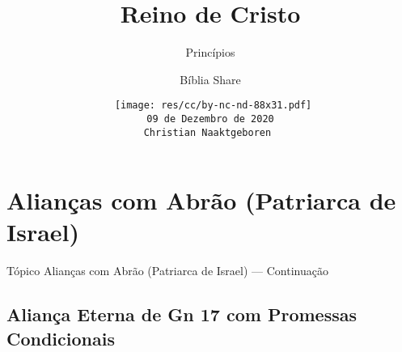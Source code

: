 \documentclass[12pt,aspectratio=169]{beamer}
\title[Reino de Cristo -- Princípios]{Reino de Cristo}
\subtitle{Princípios}
\author{Bíblia Share}
\date[{\tiny\tt 09 de Dezembro de 2020}]{{\scriptsize\tt%
    \texttt{[image: res/cc/by-nc-nd-88x31.pdf]}\\[\smallskipamount]
    09 de Dezembro de 2020\\
    Christian Naaktgeboren
}}
\newcommand{\BRI}[1]{{\textcolor{BSpbg}{#1}}}   %
\begin{document}
\begin{frame}
    \titlepage
\end{frame}
\section{Alianças com Abrão (Patriarca de Israel)}

    \begin{frame}
        \par\noindent\hspace*{0.05\linewidth}%
        \begin{minipage}{0.9\linewidth}%
            \large%
            \begin{alertblock}{Tópico}
                Alianças com Abrão (Patriarca de Israel) --- Continuação
            \end{alertblock}
        \end{minipage}%
    \end{frame}

    \subsection{\BRI{Aliança Eterna} de Gn 17 com Promessas Condicionais}
\end{document}
